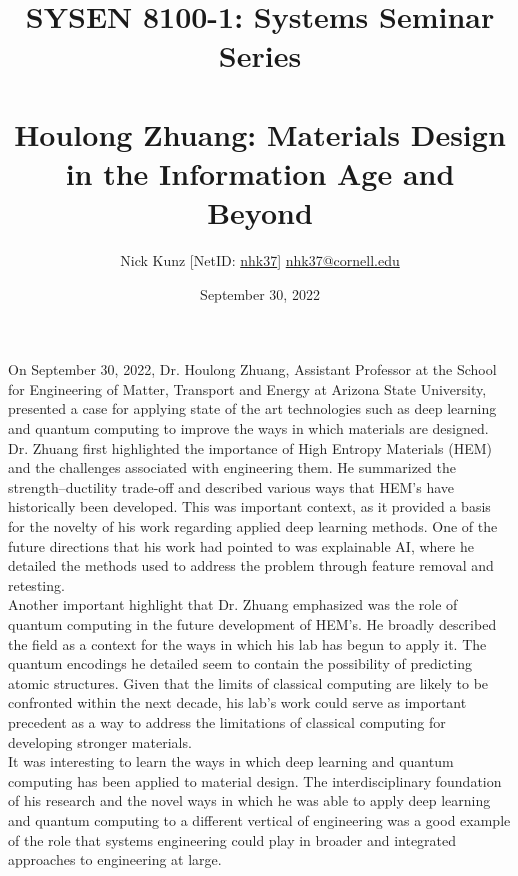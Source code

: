 \documentclass[11pt]{article}
\begin{document}
\title{SYSEN 8100-1: Systems Seminar Series\\~\\
    \Large Houlong Zhuang: Materials Design in the Information Age and Beyond
}
\author{
    Nick Kunz [NetID: \url{nhk37}] \hyperlink{nhk37@cornell.edu}{nhk37@cornell.edu}
}
\date{September 30, 2022}
\maketitle

On September 30, 2022, Dr. Houlong Zhuang, Assistant Professor at the School for Engineering of Matter, Transport and Energy at Arizona State University, presented a case for applying state of the art technologies such as deep learning and quantum computing to improve the ways in which materials are designed.\\

Dr. Zhuang first highlighted the importance of High Entropy Materials (HEM) and the challenges associated with engineering them. He summarized the strength–ductility trade-off and described various ways that HEM's have historically been developed. This was important context, as it provided a basis for the novelty of his work regarding applied deep learning methods. One of the future directions that his work had pointed to was explainable AI, where he detailed the methods used to address the problem through feature removal and retesting. \\ 

Another important highlight that Dr. Zhuang emphasized was the role of quantum computing in the future development of HEM's. He broadly described the field as a context for the ways in which his lab has begun to apply it. The quantum encodings he detailed seem to contain the possibility of predicting atomic structures. Given that the limits of classical computing are likely to be confronted within the next decade, his lab's work could serve as important precedent as a way to address the limitations of classical computing for developing stronger materials.\\

It was interesting to learn the ways in which deep learning and quantum computing has been applied to material design. The interdisciplinary foundation of his research and the novel ways in which he was able to apply deep learning and quantum computing to a different vertical of engineering was a good example of the role that systems engineering could play in broader and integrated approaches to engineering at large. 
\end{document}

